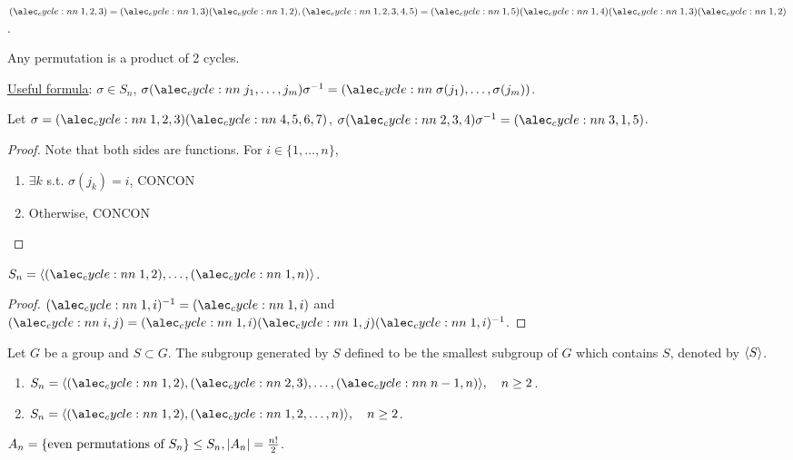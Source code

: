 \begin{example}
  $\cycle{1,2,3} = \cycle{1,3}\cycle{1,2},
  \cycle{1,2,3,4,5} = \cycle{1,5}\cycle{1,4}\cycle{1,3}\cycle{1,2}$.

  Any permutation is a product of 2 cycles.
\end{example}

\underline{Useful formula}: $\sigma \in S_n$,
$\sigma \cycle{j_1, \dots, j_m} \sigma^{-1} =
\cycle{\sigma(j_1),\dots,\sigma(j_m)}$.

\begin{example}
  Let $\sigma = \cycle{1,2,3}\cycle{4,5,6,7}$,
  $\sigma \cycle{2,3,4} \sigma^{-1} = \cycle{3,1,5}$.
\end{example}

\begin{proof}
  Note that both sides are functions. For $i \in \{1,\dots,n\}$,
  \begin{enumerate}
    \item $\exists k$ s.t.  $\sigma(j_k) = i$, CONCON
    \item Otherwise, CONCON
  \end{enumerate}
\end{proof}

\begin{fact}
  $S_n = \gen{\cycle{1,2},\dots,\cycle{1,n}}$.
  \begin{proof}
    $\cycle{1,i}^{-1} = \cycle{1,i}$ and
    $\cycle{i,j} = \cycle{1,i}\cycle{1,j}\cycle{1,i}^{-1}$.
  \end{proof}
\end{fact}

\begin{definition}
  Let $G$ be a group and $S \subset G$. The subgroup generated by $S$ defined
  to be the smallest subgroup of $G$ which contains $S$, denoted by
  $\langle S\rangle$.
\end{definition}

\begin{exercise} \mbox{}
  \begin{enumerate}
    \item $S_n = \gen{\cycle{1,2},\cycle{2,3},\dots,\cycle{n-1,n}}, \quad n \ge 2$.
    \item $S_n = \gen{\cycle{1,2},\cycle{1,2,\dots,n}}, \quad n \ge 2$.
  \end{enumerate}
\end{exercise}

\begin{definition}
  $A_n = \{ \text{even permutations of $S_n$} \} \le S_n,
  \lvert A_n\rvert = \frac{n!}{2}$.
\end{definition}


